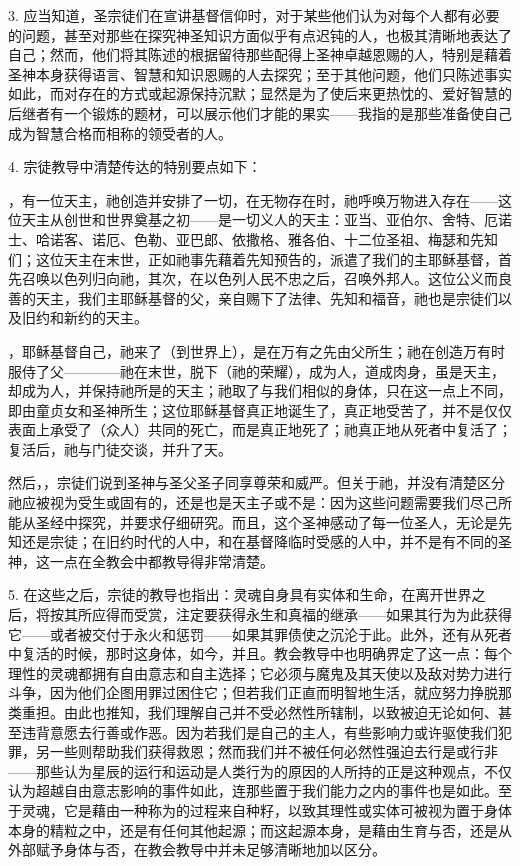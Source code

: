 3. 应当知道，圣宗徒们在宣讲基督信仰时，对于某些他们认为对每个人都有必要的问题，甚至对那些在探究神圣知识方面似乎有点迟钝的人，也极其清晰地表达了自己；然而，他们将其陈述的根据留待那些配得上圣神卓越恩赐的人，特别是藉着圣神本身获得语言、智慧和知识恩赐的人去探究；至于其他问题，他们只陈述事实如此，而对存在的方式或起源保持沉默；显然是为了使后来更热忱的、爱好智慧的后继者有一个锻炼的题材，可以展示他们才能的果实——我指的是那些准备使自己成为智慧合格而相称的领受者的人。\par

4. 宗徒教导中清楚传达的特别要点如下：\par

，有一位天主，祂创造并安排了一切，在无物存在时，祂呼唤万物进入存在——这位天主从创世和世界奠基之初——是一切义人的天主：亚当、亚伯尔、舍特、厄诺士、哈诺客、诺厄、色勒、亚巴郎、依撒格、雅各伯、十二位圣祖、梅瑟和先知们；这位天主在末世，正如祂事先藉着先知预告的，派遣了我们的主耶稣基督，首先召唤以色列归向祂，其次，在以色列人民不忠之后，召唤外邦人。这位公义而良善的天主，我们主耶稣基督的父，亲自赐下了法律、先知和福音，祂也是宗徒们以及旧约和新约的天主。\par

，耶稣基督自己，祂来了（到世界上），是在万有之先由父所生；祂在创造万有时服侍了父————祂在末世，脱下（祂的荣耀），成为人，道成肉身，虽是天主，却成为人，并保持祂所是的天主；祂取了与我们相似的身体，只在这一点上不同，即由童贞女和圣神所生；这位耶稣基督真正地诞生了，真正地受苦了，并不是仅仅表面上承受了（众人）共同的死亡，而是真正地死了；祂真正地从死者中复活了；复活后，祂与门徒交谈，并升了天。\par

然后，，宗徒们说到圣神与圣父圣子同享尊荣和威严。但关于祂，并没有清楚区分祂应被视为受生或固有的，还是也是天主子或不是：因为这些问题需要我们尽己所能从圣经中探究，并要求仔细研究。而且，这个圣神感动了每一位圣人，无论是先知还是宗徒；在旧约时代的人中，和在基督降临时受感的人中，并不是有不同的圣神，这一点在全教会中都教导得非常清楚。\par

5. 在这些之后，宗徒的教导也指出：灵魂自身具有实体和生命，在离开世界之后，将按其所应得而受赏，注定要获得永生和真福的继承——如果其行为为此获得它——或者被交付于永火和惩罚——如果其罪债使之沉沦于此。此外，还有从死者中复活的时候，那时这身体，如今，并且。教会教导中也明确界定了这一点：每个理性的灵魂都拥有自由意志和自主选择；它必须与魔鬼及其天使以及敌对势力进行斗争，因为他们企图用罪过困住它；但若我们正直而明智地生活，就应努力挣脱那类重担。由此也推知，我们理解自己并不受必然性所辖制，以致被迫无论如何、甚至违背意愿去行善或作恶。因为若我们是自己的主人，有些影响力或许驱使我们犯罪，另一些则帮助我们获得救恩；然而我们并不被任何必然性强迫去行是或行非——那些认为星辰的运行和运动是人类行为的原因的人所持的正是这种观点，不仅认为超越自由意志影响的事件如此，连那些置于我们能力之内的事件也是如此。至于灵魂，它是藉由一种称为的过程来自种籽，以致其理性或实体可被视为置于身体本身的精粒之中，还是有任何其他起源；而这起源本身，是藉由生育与否，还是从外部赋予身体与否，在教会教导中并未足够清晰地加以区分。\par

